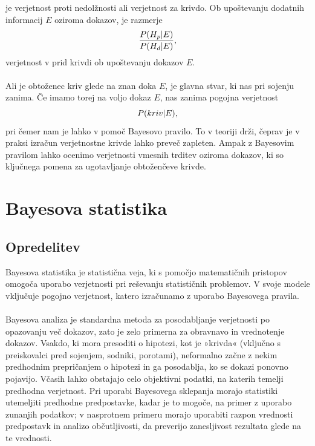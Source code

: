 \documentclass[fin1, tisk]{fmfdelo}
\theoremstyle{definition}
\theoremstyle{trditev}
\theoremstyle{izrek}
\begin{document}
je verjetnost proti nedolžnosti ali verjetnost za krivdo. Ob upoštevanju dodatnih informacij $E$ oziroma dokazov, je razmerje
\begin{equation}
   \frac{P(H_p \lvert E)}{P(H_d \lvert E)} \vspace{2mm},
\end{equation}
verjetnost v prid krivdi ob upoštevanju dokazov $E$.\\\\
Ali je obtoženec kriv glede na znan doka $E$, je glavna stvar, ki nas pri sojenju zanima. Če imamo torej na voljo dokaz $E$, nas zanima pogojna 
verjetnost
\[
    P(kriv \lvert E), \vspace{2mm}
\]
pri čemer nam je lahko v pomoč Bayesovo pravilo. To v teoriji drži, čeprav je v praksi izračun verjetnostne krivde lahko preveč zapleten. Ampak 
z Bayesovim pravilom lahko ocenimo verjetnosti vmesnih trditev oziroma dokazov, ki so ključnega pomena za ugotavljanje obtoženčeve krivde.

\section{Bayesova statistika}

\subsection{Opredelitev}
Bayesova statistika je statistična veja, ki s pomočjo matematičnih pristopov omogoča uporabo verjetnosti pri reševanju statističnih
problemov. V svoje modele vključuje pogojno verjetnost, katero izračunamo z uporabo Bayesovega pravila. \\\\
Bayesova analiza je standardna metoda za posodabljanje verjetnosti po opazovanju več dokazov, zato je zelo primerna za obravnavo in vrednotenje 
dokazov. Vsakdo, ki mora presoditi o hipotezi, kot je »krivda« (vključno s preiskovalci pred sojenjem, sodniki, porotami), neformalno začne z nekim
predhodnim prepričanjem o hipotezi in ga posodablja, ko se dokazi ponovno pojavijo. Včasih lahko obstajajo celo objektivni podatki, na katerih temelji
predhodna verjetnost. Pri uporabi Bayesovega sklepanja morajo statistiki utemeljiti predhodne predpostavke, kadar je to mogoče, na primer z
uporabo zunanjih podatkov; v nasprotnem primeru morajo uporabiti razpon vrednosti predpostavk in analizo občutljivosti, da preverijo zanesljivost rezultata
glede na te vrednosti.
\end{document}
